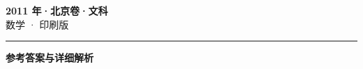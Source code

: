 \documentclass[zihao=5, a4paper]{ctexart}
\begin{document}
\begin{center}
  {\Large\bfseries 2011 年·北京卷·文科}\\[4pt]
  {\large 数学 · 印刷版}
\end{center}
\medskip
{}

\par\bigskip\hrule\bigskip
{}
\begin{center}{\large\bfseries 参考答案与详细解析}\end{center}
\smallskip

\end{document}
